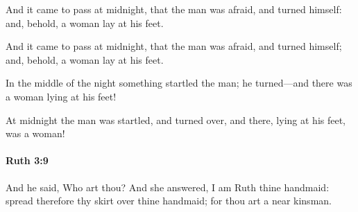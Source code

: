 			And it came to pass at midnight, that the man was afraid, and turned himself: and, behold, a woman lay at his feet.

			\begin{versebox}
					\item[BHS] 
					\item[LXX] 
					\item[ASV] And it came to pass at midnight, that the man was afraid, and turned himself; and, behold, a woman lay at his feet.
					\item[NIV] In the middle of the night something startled the man; he turned—and there was a woman lying at his feet!
					\item[NRSV] At midnight the man was startled, and turned over, and there, lying at his feet, was a woman!
			\end{versebox}

		\paragraph{Ruth 3:9} %
			\label{RUTH-3-9}

			And he said, Who art thou? And she answered, I am Ruth thine handmaid: spread therefore thy skirt over thine handmaid; for thou art a near kinsman.

